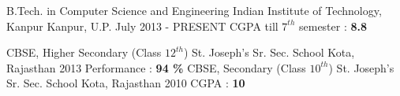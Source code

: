 
\begin{cventries}

  \cventry
    {B.Tech. in Computer Science and Engineering} %
    {Indian Institute of Technology, Kanpur} %
    {Kanpur, U.P.} %
    {July 2013 - PRESENT} %
    {
    	CGPA till $7^{th}$ semester : \textbf{8.8}
    }
    
   \cventry
       {CBSE, Higher Secondary (Class $12^{th}$)} %
       {St. Joseph's Sr. Sec. School} %
       {Kota, Rajasthan} %
       {2013} %
       {
       	 Performance : \textbf{94 \%}
       }
	\cventry
	{CBSE, Secondary (Class $10^{th}$)} %
	{St. Joseph's Sr. Sec. School} %
	{Kota, Rajasthan} %
	{2010} %
	{
		CGPA : \textbf{10}
	}
\end{cventries}
